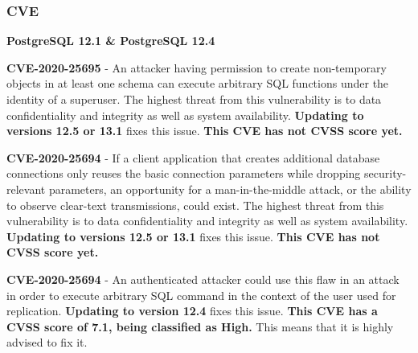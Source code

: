 \subsubsection{CVE}



\textbf{PostgreSQL 12.1 \& PostgreSQL 12.4}

\textbf{CVE-2020-25695} - An attacker having permission to create non-temporary objects in at least one schema can execute arbitrary SQL functions under the identity of a superuser. The highest threat from this vulnerability is to data confidentiality and integrity as well as system availability.\cite{postgres1} \textbf{Updating to versions 12.5 or 13.1} fixes this issue. \textbf{This CVE has not CVSS score yet.}

\textbf{CVE-2020-25694} -  If a client application that creates additional database connections only reuses the basic connection parameters while dropping security-relevant parameters, an opportunity for a man-in-the-middle attack, or the ability to observe clear-text transmissions, could exist. The highest threat from this vulnerability is to data confidentiality and integrity as well as system availability.\cite{postgres2} \textbf{Updating to versions 12.5 or 13.1} fixes this issue. \textbf{This CVE has not CVSS score yet.}

\textbf{CVE-2020-25694} -  An authenticated attacker could use this flaw in an attack in order to execute arbitrary SQL command in the context of the user used for replication.\cite{postgres3} \textbf{Updating to version 12.4} fixes this issue. \textbf{This CVE has a CVSS score of 7.1, being classified as High.} This means that it is highly advised to fix it.

